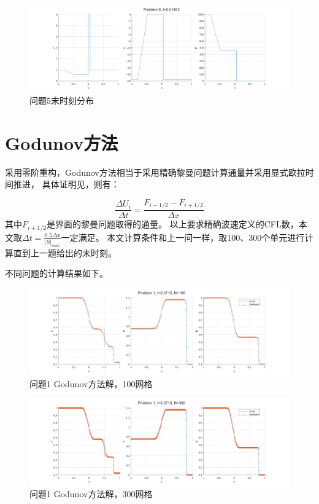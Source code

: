 \documentclass[UTF8,zihao=5]{ctexart} %
\newcommand*{\inc}[0]{{\Delta}}
\begin{document}
\begin{figure}[H]
    \centering
    \includegraphics[width=18cm]{p5_l.png}  %
    \caption{问题5末时刻分布}
    \label{fig:5b}
\end{figure}

\section{Godunov方法}

采用零阶重构，Godunov方法相当于采用精确黎曼问题计算通量并采用显式欧拉时间推进，
具体证明见\cite{2013Riemann}，则有：

$$
    \frac{\inc U_i}{\inc t} = \frac{F_{i-1/2}-F_{i+1/2}}{\inc x}
$$
其中$F_{i+1/2}$是界面的黎曼问题取得的通量。
以上要求精确波速定义的CFL数，本文取$\inc t = \frac{0.5\inc x}{|S|_{max}}$一定满足。
本文计算条件和上一问一样，取100、300个单元进行计算直到上一题给出的末时刻。

不同问题的计算结果如下。

\begin{figure}[H]
    \centering
    \includegraphics[width=18cm]{p1_gn_N100.png}  %
    \caption{问题1 Godunov方法解，100网格}
    \label{fig:1c}
\end{figure}

\begin{figure}[H]
    \centering
    \includegraphics[width=18cm]{p1_gn_N300.png}  %
    \caption{问题1 Godunov方法解，300网格}
    \label{fig:1c}
\end{figure}
\end{document}
